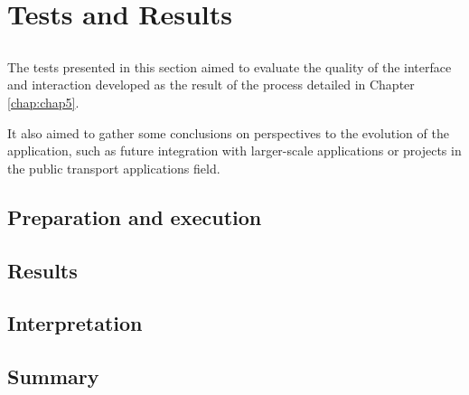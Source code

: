 \chapter{Tests and Results} \label{chap:chap6}

\section*{}

The tests presented in this section aimed to evaluate the quality of the interface and interaction developed as the result of the process detailed in Chapter \ref{chap:chap5}. 

It also aimed to gather some conclusions on perspectives to the evolution of the application, such as future integration with larger-scale applications or projects in the public transport applications field.

\section{Preparation and execution}

\section{Results}

\section{Interpretation}

\section{Summary}



